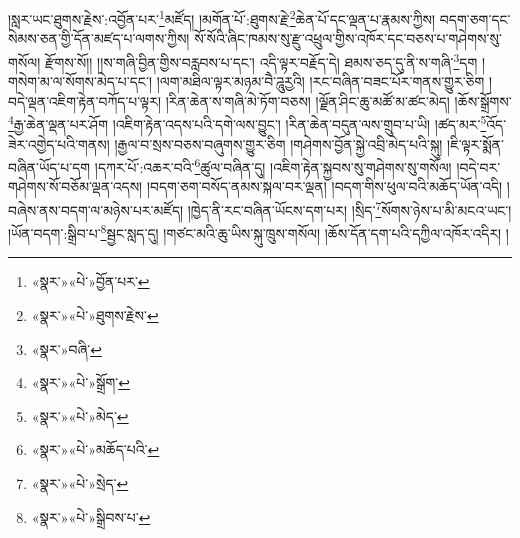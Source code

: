 །སླར་ཡང་ཐུགས་རྗེས་:འབྱོན་པར་\footnote{«སྣར་»«པེ་»བྱོན་པར་}མཛོད། །མགོན་པོ་:ཐུགས་རྗེ་\footnote{«སྣར་»«པེ་»ཐུགས་རྗེས་}ཆེན་པོ་དང་ལྡན་པ་རྣམས་ཀྱིས། བདག་ཅག་དང་སེམས་ཅན་གྱི་དོན་མཛད་པ་ལགས་ཀྱིས། སོ་སོའི་ཞིང་ཁམས་སུ་རྫུ་འཕྲུལ་གྱིས་འཁོར་དང་བཅས་པ་གཤེགས་སུ་གསོལ། རྫོགས་སོ།། །།ས་གཞི་བྱིན་གྱིས་བརླབས་པ་དང་། འདི་ལྟར་བརྗོད་དེ། ཐམས་ཅད་དུ་ནི་ས་གཞི་\footnote{«སྣར་»བཞི་}དག །གསེག་མ་ལ་སོགས་མེད་པ་དང་། །ལག་མཐིལ་ལྟར་མཉམ་བཻ་ཌཱུརྱའི། །རང་བཞིན་བཟང་པོར་གནས་གྱུར་ཅིག །བདེ་ལྡན་འཇིག་རྟེན་བཀོད་པ་ལྟར། །རིན་ཆེན་ས་གཞི་མེ་ཏོག་བཅས། །ལྗོན་ཤིང་ཆུ་མཚོ་མ་ཚང་མེད། །ཆོས་སྒྲོགས་\footnote{«སྣར་»«པེ་»སྒྲོག་}རྒྱ་ཆེན་ལྡན་པར་ཤོག །འཇིག་རྟེན་འདས་པའི་དགེ་ལས་བྱུང་། །རིན་ཆེན་བདུན་ལས་གྲུབ་པ་ཡི། །ཚད་མར་\footnote{«སྣར་»«པེ་»མེད་}འོད་ཟེར་འགྱེད་པའི་གནས། །རྒྱལ་བ་སྲས་བཅས་བཞུགས་གྱུར་ཅིག །གཤེགས་བྱོན་སྐྱེ་འབྲི་མེད་པའི་སྐུ། །ཇི་ལྟར་སྨོན་བཞིན་ཡོད་པ་དག །དཀར་པོ་:འཆར་བའི་\footnote{«སྣར་»«པེ་»མཆོད་པའི་}ཚུལ་བཞིན་དུ། །འཇིག་རྟེན་སྐྱབས་སུ་གཤེགས་སུ་གསོལ། །བདེ་བར་གཤེགས་སོ་བཅོམ་ལྡན་འདས། །བདག་ཅག་བསོད་ནམས་སྐལ་བར་ལྡན། །བདག་གིས་ཕུལ་བའི་མཆོད་ཡོན་འདི། །བཞེས་ནས་བདག་ལ་མཉེས་པར་མཛོད། །ཁྱེད་ནི་རང་བཞིན་ཡོངས་དག་པར། །སྲིད་\footnote{«སྣར་»«པེ་»སྲེད་}སོགས་ཉེས་པ་མི་མངའ་ཡང་། །ཡོན་བདག་:སྒྲིབ་པ་\footnote{«སྣར་»«པེ་»སྒྲིབས་པ་}སྦྱང་སླད་དུ། །གཙང་མའི་ཆུ་ཡིས་སྐུ་ཁྲུས་གསོལ། །ཆོས་དོན་དག་པའི་དཀྱིལ་འཁོར་འདིར། །
